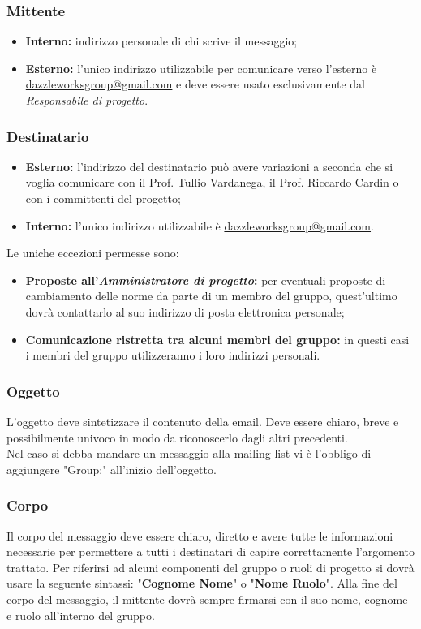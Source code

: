 		\subsubsection{Mittente}
\begin{itemize}
	\item \textbf{Interno:} indirizzo personale di chi scrive il messaggio;
	\item \textbf{Esterno:} l'unico indirizzo utilizzabile per comunicare verso l'esterno è \url{dazzleworksgroup@gmail.com} e deve essere usato esclusivamente dal \textit{Responsabile di progetto}.
\end{itemize}
	\subsubsection{Destinatario}
\begin{itemize}
	\item \textbf{Esterno:} l'indirizzo del destinatario può avere variazioni a seconda che si voglia comunicare con il Prof. Tullio Vardanega, il Prof. Riccardo Cardin o con i committenti del progetto;
	\item \textbf{Interno:} l'unico indirizzo utilizzabile è \url{dazzleworksgroup@gmail.com}.
\end{itemize}
Le uniche eccezioni permesse sono:
\begin{itemize}
	\item \textbf{Proposte all'\textit{Amministratore di progetto}:} per eventuali proposte di cambiamento delle norme da parte di un membro del gruppo, quest'ultimo dovrà contattarlo al suo indirizzo di posta elettronica personale;
	\item \textbf{Comunicazione ristretta tra alcuni membri del gruppo:} in questi casi i membri del gruppo utilizzeranno i loro indirizzi personali.
\end{itemize}

		\subsubsection{Oggetto}
L'oggetto deve sintetizzare il contenuto della email. Deve essere chiaro, breve e possibilmente univoco in modo da riconoscerlo dagli altri precedenti.\\
Nel caso si debba mandare un messaggio alla mailing list vi è l'obbligo di aggiungere "Group:" all'inizio dell'oggetto.
		\subsubsection{Corpo}
Il corpo del messaggio deve essere chiaro, diretto e avere tutte le informazioni necessarie per permettere a tutti i destinatari di capire correttamente l'argomento trattato. Per riferirsi ad alcuni componenti del gruppo o ruoli di progetto si dovrà usare la seguente sintassi: "\textbf{Cognome Nome}" o "\textbf{Nome Ruolo}". Alla fine del corpo del messaggio, il mittente dovrà sempre firmarsi con il suo nome, cognome e ruolo all'interno del gruppo.
